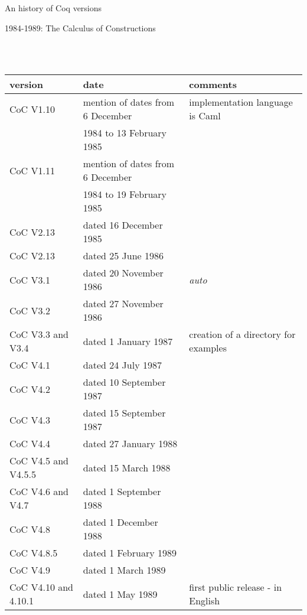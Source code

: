 \documentclass[a4paper]{book}
\newcommand{\feature}[1]{{\em #1}}
\begin{document}
\begin{center}
\begin{huge}
An history of Coq versions
\end{huge}
\end{center}
\bigskip

\centerline{\large 1984-1989: The Calculus of Constructions}
\mbox{}\\
\mbox{}\\
\begin{tabular}{l|l|l}
version & date & comments \\
\hline
CoC V1.10& mention of dates from 6 December & implementation language is Caml\\
         & 1984 to 13 February 1985 \\

CoC V1.11& mention of dates from 6 December\\
         & 1984 to 19 February 1985\\

CoC V2.13& dated 16 December 1985\\

CoC V2.13& dated 25 June 1986\\

CoC V3.1& dated 20 November 1986 & \feature{auto}\\

CoC V3.2& dated 27 November 1986\\

CoC V3.3 and V3.4& dated 1 January 1987 & creation of a directory for examples\\

CoC V4.1& dated 24 July 1987\\

CoC V4.2& dated 10 September 1987\\

CoC V4.3& dated 15 September 1987\\

CoC V4.4& dated 27 January 1988\\

CoC V4.5 and V4.5.5& dated 15 March 1988\\

CoC V4.6 and V4.7& dated 1 September 1988\\

CoC V4.8& dated 1 December 1988\\

CoC V4.8.5& dated 1 February 1989\\

CoC V4.9& dated 1 March 1989\\

CoC V4.10 and 4.10.1& dated 1 May 1989 & first public release - in English\\
\end{tabular}
\end{document}

